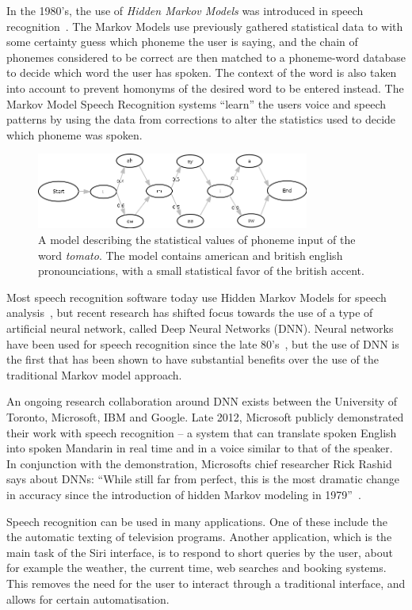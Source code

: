 In the 1980's, the use of \emph{Hidden Markov Models} was introduced in speech recognition~\cite{rabiner1986introduction}. The Markov Models use previously gathered statistical data to with some certainty guess which phoneme the user is saying, and the chain of phonemes considered to be correct are then matched to a phoneme-word database to decide which word the user has spoken. The context of the word is also taken into account to prevent homonyms of the desired word to be entered instead. The Markov Model Speech Recognition systems ``learn'' the users voice and speech patterns by using the data from corrections to alter the statistics used to decide which phoneme was spoken.

\begin{figure}[]
\includegraphics[width=0.8\textwidth] {bilder/tomato.jpg}
\caption{A model describing the statistical values of phoneme input of the word \emph{tomato}. The model contains american and british english pronounciations, with a small statistical favor of the british accent.}
\label{ibooks}
\end{figure}

Most speech recognition software today use Hidden Markov Models for speech analysis~\cite{DNN}, but recent research has shifted focus towards the use of a type of artificial neural network, called Deep Neural Networks (DNN). Neural networks have been used for speech recognition since the late 80's~\cite{waibel:phoneme}, but the use of DNN is the first that has been shown to have substantial benefits over the use of the traditional Markov model approach.

An ongoing research collaboration around DNN exists between the University of Toronto, Microsoft, IBM and Google. Late 2012, Microsoft publicly demonstrated their work with speech recognition -- a system that can translate spoken English into spoken Mandarin in real time and in a voice similar to that of the speaker. In conjunction with the demonstration, Microsofts chief researcher Rick Rashid says about DNNs: ``While still far from perfect, this is the most dramatic change in accuracy since the introduction of hidden Markov modeling in 1979''~\cite{chin}.

Speech recognition can be used in many applications. One of these include the the automatic texting of television programs. Another application, which is the main task of the Siri interface, is to respond to short queries by the user, about for example the weather, the current time, web searches and booking systems. This removes the need for the user to interact through a traditional interface, and allows for certain automatisation.
